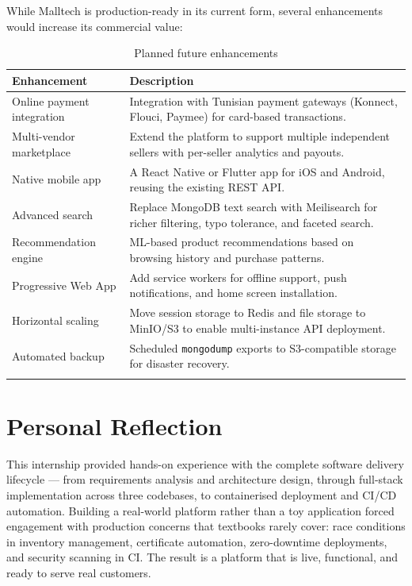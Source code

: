 While Malltech is production-ready in its current form, several enhancements would
increase its commercial value:

\begin{longtable}{|m{4cm}|m{9.5cm}|}
    \hline
    \textbf{Enhancement} & \textbf{Description} \\
    \hline
    \endhead
    \endfoot
    \endlastfoot
    \hline
    Online payment integration & Integration with Tunisian payment gateways (Konnect, Flouci, Paymee) for card-based transactions. \\
    \hline
    Multi-vendor marketplace & Extend the platform to support multiple independent sellers with per-seller analytics and payouts. \\
    \hline
    Native mobile app & A React Native or Flutter app for iOS and Android, reusing the existing REST API. \\
    \hline
    Advanced search & Replace MongoDB text search with Meilisearch for richer filtering, typo tolerance, and faceted search. \\
    \hline
    Recommendation engine & ML-based product recommendations based on browsing history and purchase patterns. \\
    \hline
    Progressive Web App & Add service workers for offline support, push notifications, and home screen installation. \\
    \hline
    Horizontal scaling & Move session storage to Redis and file storage to MinIO/S3 to enable multi-instance API deployment. \\
    \hline
    Automated backup & Scheduled \texttt{mongodump} exports to S3-compatible storage for disaster recovery. \\
    \hline
    \caption{Planned future enhancements}
    \label{tab:enhancements}
\end{longtable}

\section*{Personal Reflection}

This internship provided hands-on experience with the complete software delivery
lifecycle --- from requirements analysis and architecture design, through full-stack
implementation across three codebases, to containerised deployment and CI/CD
automation. Building a real-world platform rather than a toy application forced
engagement with production concerns that textbooks rarely cover: race conditions
in inventory management, certificate automation, zero-downtime deployments, and
security scanning in CI. The result is a platform that is live, functional, and
ready to serve real customers.
